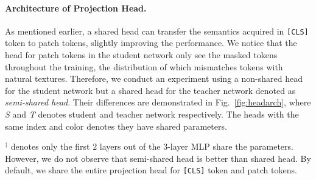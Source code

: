 \documentclass{article} %
\begin{document}
\paragraph{Architecture of Projection Head.} 
As mentioned earlier, a shared head can transfer the semantics acquired in \texttt{[CLS]} token to patch tokens, slightly improving the performance. 
We notice that the head for patch tokens in the student network only see the masked tokens throughout the training, the distribution of which mismatches tokens with natural textures. 
Therefore, we conduct an experiment using a non-shared head for the student network but a shared head for the teacher network denoted as \textit{semi-shared head}. 
Their differences are demonstrated in Fig.~\ref{fig:headarch}, where \textit{S} and \textit{T} denotes student and teacher network respectively. The heads with the same index and color denotes they have shared parameters. 
\vspace{-0.3cm}
\begin{table}[H]
\centering
{}
\end{table}
\vspace{-0.7cm}
$^\dag$ denotes only the first $2$ layers out of the $3$-layer MLP share the parameters. However, we do not observe that semi-shared head is better than shared head. By default, we share the entire projection head for \texttt{[CLS]} token and patch tokens.
\end{document}
